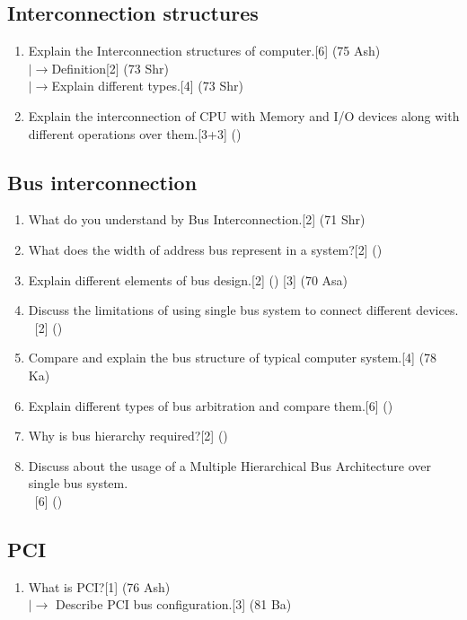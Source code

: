 \documentclass[12pt]{article}
\newcommand{\lb}{\left|\rightarrow\right.}
\newcommand{\enter}{\\\textcolor{white}{1}}
\begin{document}
\subsection{Interconnection structures}
\begin{enumerate}[noitemsep, topsep = 0pt]
\item Explain the Interconnection structures of computer.\hfill[6] (75 Ash)\\ 
$\lb$Definition\hfill[2] (73 Shr)\\
$\lb$Explain different types.\hfill[4] (73 Shr)
\item Explain the interconnection of CPU with Memory and I/O devices along with different operations over them.\hfill[3+3] ()
\end{enumerate}
\subsection{Bus interconnection}
\begin{enumerate}[noitemsep, topsep = 0pt]
\item What do you understand by Bus Interconnection.\hfill[2] (71 Shr)
\item What does the width of address bus represent in a system?\hfill[2] ()
\item Explain different elements of bus design.\hfill[2] () [3] (70 Asa)
\item Discuss the limitations of using single bus system to connect different devices.
\enter\hfill[2] ()
\item Compare and explain the bus structure of typical computer system.\hfill[4] (78 Ka)
\item Explain different types of bus arbitration and compare them.\hfill[6] ()
\item Why is bus hierarchy required?\hfill[2] ()
\item Discuss about the usage of a Multiple Hierarchical Bus Architecture over single bus system.
\enter\hfill[6] ()
\end{enumerate}
\subsection{PCI}
\begin{enumerate}[noitemsep, topsep = 0pt]
\item What is PCI?\hfill[1] (76 Ash)\\
$\lb$ Describe PCI bus configuration.\hfill[3] (81 Ba)
\end{enumerate}
\end{document}
